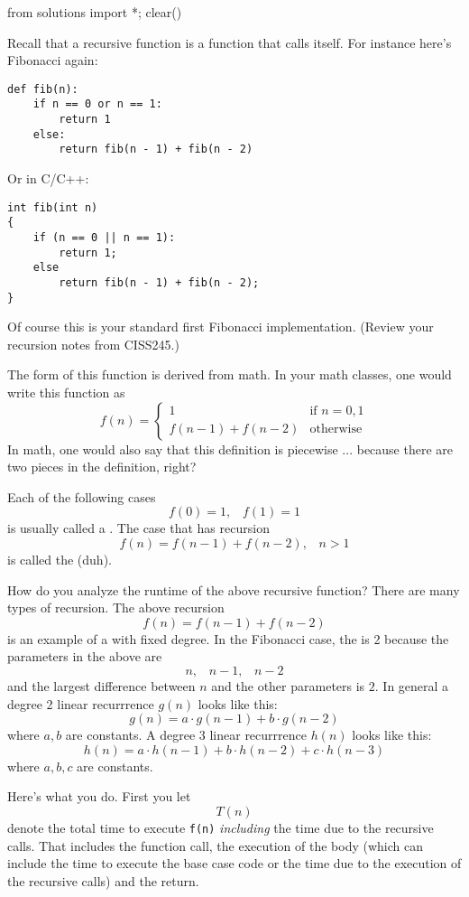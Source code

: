 \begin{python0}
from solutions import *; clear()
\end{python0}

Recall that a recursive function is a function that calls itself.
For instance here's Fibonacci again:
{\small
\begin{Verbatim}[frame=single,fontsize=\footnotesize]
def fib(n):
    if n == 0 or n == 1:
        return 1
    else:
        return fib(n - 1) + fib(n - 2)
\end{Verbatim}
}
Or in C/C++:
{\small
\begin{Verbatim}[frame=single,fontsize=\footnotesize]
int fib(int n)
{
    if (n == 0 || n == 1):
        return 1;
    else
        return fib(n - 1) + fib(n - 2);
}
\end{Verbatim}
}
Of course this is your standard first Fibonacci implementation. 
(Review your recursion notes from CISS245.)

The form of this function is derived from math.
In your math classes, one would write this function as
\[
f(n) = 
\begin{cases}
1                   & \text{if $n = 0, 1$} \\
f(n - 1) + f(n - 2) & \text{otherwise}
\end{cases}
\] 
In math, one would also say that this definition is piecewise ... 
because there are two pieces in the definition, right?

Each of the following cases
\[
f(0) = 1, \,\,\,\,\, f(1) = 1
\]
is usually called a .
The case that has recursion
\[
f(n) = f(n - 1) + f(n - 2) , \,\,\,\,\, n > 1
\]
is called the  (duh).

How do you analyze the runtime of the above recursive function?
There are many types of recursion.
The above recursion
\[
f(n) = f(n - 1) + f(n - 2)
\]
is an example of a  with fixed degree.
In the Fibonacci case, the  is 2 because
the parameters in the above are
\[
n, \,\,\,\,\, n - 1, \,\,\,\,\, n - 2
\]
and the largest difference between $n$ and the other parameters is $2$.
In general a degree 2 linear recurrrence $g(n)$ looks like this:
\[
g(n) = a \cdot g(n-1) + b \cdot g(n-2)
\]
where $a,b$ are constants.
A degree 3 linear recurrrence $h(n)$ looks like this:
\[
h(n) = a \cdot h(n-1) + b \cdot h(n-2) + c \cdot h(n-3)
\]
where $a,b,c$ are constants.



Here's what you do.
First you let 
\[
T(n)
\]
denote the total time to execute \verb!f(n)!
\textit{including} the time due to the recursive calls.
That includes the function call, the execution of the body (which can
include the time to execute the base case code or
the time due to the execution of the recursive calls)
and the return.

